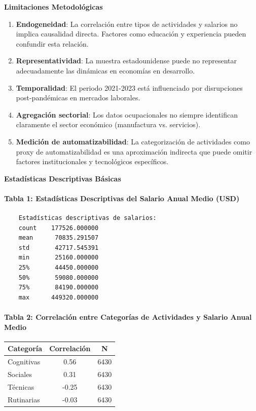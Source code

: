 \documentclass{article}
\theoremstyle{remark}
\theoremstyle{definition}
\begin{document}
\begin{tcolorbox}
\textbf{Limitaciones Metodológicas}

\begin{enumerate}
\item \textbf{Endogeneidad}: La correlación entre tipos de actividades y salarios no implica causalidad directa. Factores como educación y experiencia pueden confundir esta relación.

\item \textbf{Representatividad}: La muestra estadounidense puede no representar adecuadamente las dinámicas en economías en desarrollo.

\item \textbf{Temporalidad}: El periodo 2021-2023 está influenciado por disrupciones post-pandémicas en mercados laborales.

\item \textbf{Agregación sectorial}: Los datos ocupacionales no siempre identifican claramente el sector económico (manufactura vs. servicios).

\item \textbf{Medición de automatizabilidad}: La categorización de actividades como proxy de automatizabilidad es una aproximación indirecta que puede omitir factores institucionales y tecnológicos específicos.
\end{enumerate}

\textbf{Estadísticas Descriptivas Básicas}

\paragraph{Tabla 1: Estadísticas Descriptivas del Salario Anual Medio (USD)}

    \begin{verbatim}
    Estadísticas descriptivas de salarios:
    count    177526.000000
    mean      70835.291507
    std       42717.545391
    min       25160.000000
    25%       44450.000000
    50%       59080.000000
    75%       84190.000000
    max      449320.000000
    \end{verbatim}


\paragraph{Tabla 2: Correlación entre Categorías de Actividades y Salario Anual Medio}
\begin{table}[H]
\centering
\begin{tabular}{|l|c|c|}
\hline
\textbf{Categoría} & \textbf{Correlación} & \textbf{N} \\
\hline
Cognitivas & 0.56 & 6430 \\
Sociales & 0.31 & 6430 \\
Técnicas & -0.25 & 6430 \\
Rutinarias & -0.03 & 6430 \\
\hline
\end{tabular}
\end{table}


\end{tcolorbox}
\end{document}
